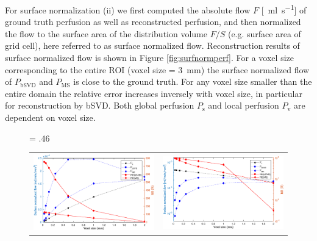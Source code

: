 \documentclass[aps,prb,article,groupedaddress,showkeys]{revtex4}
\begin{document}
For surface normalization (ii) we first computed the absolute flow $F$ [\SI{}{\milli\litre\per\second}] of ground truth perfusion as well as reconstructed perfusion, and then normalized the flow to the surface area of the distribution volume $F/S$ (e.g. surface area of grid cell), here referred to as surface normalized flow. 
Reconstruction results of surface normalized flow is shown in Figure \ref{fig:surfnormperf}. For a voxel size corresponding to the entire ROI (voxel size = \SI{3}{\milli\meter}) the surface normalized flow of $P_{\mathrm{bSVD}}$ and $P_{\mathrm{MS}}$ is close to the ground truth. For any voxel size smaller than the entire domain the relative error increases inversely with voxel size, in particular for reconstruction by bSVD. Both global perfusion $P_{\mathrm{s}}$ and local perfusion $P_{\mathrm{v}}$ are dependent on voxel size.
    \begin{figure}[!htb]
    	\centering
    	\fwd = .46\textwidth
    	\begin{tabular}{c c}
    		\includegraphics[width=\fwd]{figs/E110_CBFOnDifferentResolutions_plot-Ps-scaleto-S.eps} & \includegraphics[width=\fwd]{figs/E110_CBFOnDifferentResolutions_plot-Pv-scaleto-S.eps}\\	

\end{tabular}
\end{figure}
\end{document}
